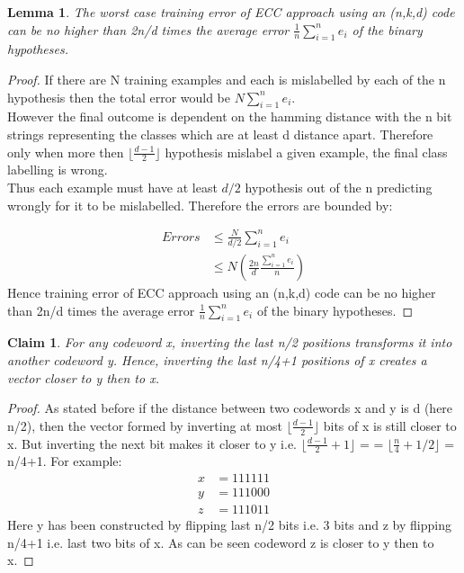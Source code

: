 \documentclass[11pt]{article}
\newtheorem{lemma}[theorem]{Lemma}
\newtheorem{claim}[theorem]{Claim}
\begin{document}
    \begin{lemma}
        The worst case training error of ECC approach using an (n,k,d) code can be no higher than 2n/d times the average error $\frac{1}{n}\sum_{i=1}^n e_i$ of the binary hypotheses.
    \end{lemma}
    \begin{proof}
        If there are N training examples and each is mislabelled by each of the n hypothesis then the total error would be $N \sum_{i=1}^n e_i$.\\
        However the final outcome is dependent on the hamming distance with the n bit strings representing the classes which are at least d distance apart. Therefore only when more then $\lfloor\frac{d-1}{2}\rfloor$ hypothesis mislabel a given example, the final class labelling is wrong.\\
        Thus each example must have at least $d/2$ hypothesis out of the n predicting wrongly for it to be mislabelled. Therefore the errors are bounded by:
    
        \begin{align*}
            Errors &\leq \frac{N}{d/2} \sum_{i=1}^n e_i\\
            &\leq N \left(\frac{2n}{d} \frac{\sum_{i=1}^n e_i}{n}\right)
         \end{align*}
        Hence training error of ECC approach using an (n,k,d) code can be no higher than 2n/d times the average error $\frac{1}{n}\sum_{i=1}^n e_i$ of the binary hypotheses.
    \end{proof}
    
    
            \begin{claim}
                For any codeword x, inverting the last n/2 positions transforms it into another codeword y. Hence, inverting the last n/4+1 positions of x creates a vector closer to y then to x.
            \end{claim}
            \begin{proof}
                As stated before if the distance between two codewords x and y is d (here n/2), then the vector formed by inverting at most $\lfloor\frac{d-1}{2}\rfloor$ bits of x is still closer to x. But inverting the next bit makes it closer to y i.e. $\lfloor\frac{d-1}{2}+1\rfloor$  =  = $\lfloor\frac{n}{4}+1/2\rfloor$ = n/4+1. For example:
                \begin{align*}
                    x & = 111111\\
                    y & = 111000\\
                    z & = 111011
                \end{align*}
                Here y has been constructed by flipping last n/2 bits i.e. 3 bits and z by flipping n/4+1 i.e. last two bits of x. As can be seen codeword z is closer to y then to x.
            \end{proof}
                
\end{document}
